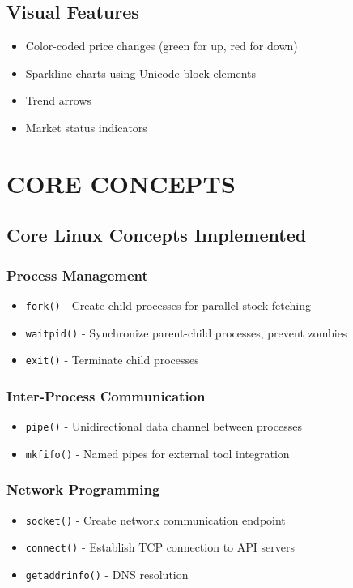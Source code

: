 \documentclass[12pt,a4paper]{article}
\begin{document}
\subsection{Visual Features}
\begin{itemize}[itemsep=0.3em]
    \item Color-coded price changes (green for up, red for down)
    \item Sparkline charts using Unicode block elements
    \item Trend arrows
    \item Market status indicators
\end{itemize}

\newpage

\section{CORE CONCEPTS}

\subsection{Core Linux Concepts Implemented}

\subsubsection{Process Management}
\begin{itemize}[itemsep=0.3em]
    \item \texttt{fork()} - Create child processes for parallel stock fetching
    \item \texttt{waitpid()} - Synchronize parent-child processes, prevent zombies
    \item \texttt{exit()} - Terminate child processes
\end{itemize}

\subsubsection{Inter-Process Communication}
\begin{itemize}[itemsep=0.3em]
    \item \texttt{pipe()} - Unidirectional data channel between processes
    \item \texttt{mkfifo()} - Named pipes for external tool integration
\end{itemize}

\subsubsection{Network Programming}
\begin{itemize}[itemsep=0.3em]
    \item \texttt{socket()} - Create network communication endpoint
    \item \texttt{connect()} - Establish TCP connection to API servers
    \item \texttt{getaddrinfo()} - DNS resolution
\end{itemize}
\end{document}
